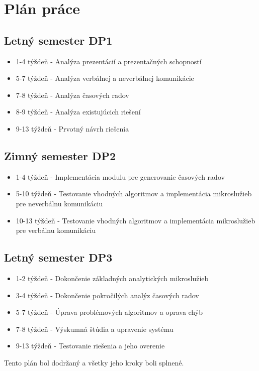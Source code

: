 \chapter{Plán práce \label{cha:workPlan}}
\pagestyle{plain}

\section{Letný semester DP1}
\begin{itemize}
    \item 1-4 týždeň - Analýza prezentácií a prezentačných schopností
    \item 5-7 týždeň - Analýza verbálnej a neverbálnej komunikácie
    \item 7-8 týždeň - Analýza časových radov
    \item 8-9 týždeň - Analýza existujúcich riešení
    \item 9-13 týždeň - Prvotný návrh riešenia
\end{itemize}

\section{Zimný semester DP2}
\begin{itemize}
    \item 1-4 týždeň - Implementácia modulu pre generovanie časových radov
    \item 5-10 týždeň - Testovanie vhodných algoritmov a implementácia mikroslužieb pre neverbálnu komunikáciu
    \item 10-13 týždeň - Testovanie vhodných algoritmov a implementácia mikroslužieb pre verbálnu komunikáciu
\end{itemize}

\section{Letný semester DP3}
\begin{itemize}
    \item 1-2 týždeň - Dokončenie základných analytických mikroslužieb
    \item 3-4 týždeň - Dokončenie pokročilých analýz časových radov
    \item 5-7 týždeň - Úprava problémových algoritmov a oprava chýb
    \item 7-8 týždeň - Výskumná štúdia a upravenie systému
    \item 9-13 týždeň - Testovanie riešenia a jeho overenie
\end{itemize}

Tento plán bol dodržaný a všetky jeho kroky boli splnené.